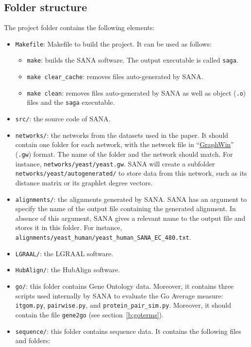 \documentclass[]{article}
\begin{document}
\subsection{Folder structure}\label{b:struct}
The project folder contains the following elements:
\begin{itemize}
\item\verb|Makefile|: Makefile to build the project. It can be used as follows:
\begin{itemize}
\item\verb|make|: builds the SANA software. The output executable is called \verb|saga|.
\item\verb|make clear_cache|: removes files auto-generated by SANA. 
\item\verb|make clean|: removes files auto-generated by SANA as well as object (\verb|.o|) files and the \verb|saga| executable.
\end{itemize}
\item\verb|src/|: the source code of SANA.
\item\verb|networks/|: the networks from the datasets used in the paper. It should contain one folder for each network, with the network file in ``\href{http://www.algorithmic-solutions.info/leda_manual/gw.html}{GraphWin}'' (\verb'.gw') format. The name of the folder and the network should match. For instance, \verb|networks/yeast/yeast.gw|. SANA will create a subfolder\\ \verb|networks/yeast/autogenerated/| to store data from this network, such as its distance matrix or its graphlet degree vectors.
\item\verb|alignments/|: the alignments generated by SANA. SANA has an argument to specify the name of the output file containing the generated alignment. In absence of this argument, SANA gives a relevant name to the output file and stores it in this folder. For instance,\\ \verb|alignments/yeast_human/yeast_human_SANA_EC_480.txt|.
\item\verb|LGRAAL/|: the LGRAAL software.
\item\verb|HubAlign/|: the HubAlign software.
\item\verb|go/|: this folder contains Gene Ontology data. Moreover, it contains three scripts used internally by SANA to evaluate the Go Average measure: \texttt{itgom.py}, \texttt{pairwise.py}, and \texttt{protein\_pair\_sim.py}. Moreover, it should contain the file \texttt{gene2go} (see section~\ref{b:goterms}).
\item\verb|sequence/|: this folder contains sequence data. It contains the following files and folders:

\end{itemize}
\end{document}
